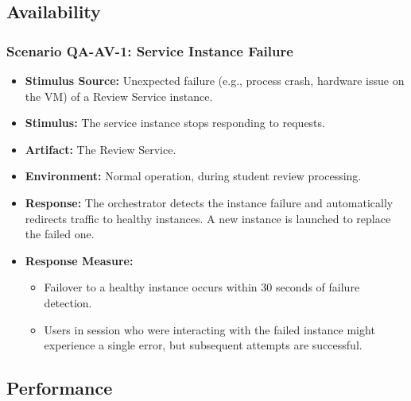 \subsection{Availability}

\subsubsection{Scenario QA-AV-1: Service Instance Failure}
\begin{itemize}
    \item \textbf{Stimulus Source:} Unexpected failure (e.g., process crash, hardware issue on the VM) of a Review Service instance.
    \item \textbf{Stimulus:} The service instance stops responding to requests.
    \item \textbf{Artifact:} The Review Service.
    \item \textbf{Environment:} Normal operation, during student review processing.
    \item \textbf{Response:} The orchestrator detects the instance failure and automatically redirects traffic to healthy instances. A new instance is launched to replace the failed one.
    \item \textbf{Response Measure:}
    \begin{itemize}
        \item Failover to a healthy instance occurs within 30 seconds of failure detection.
        \item Users in session who were interacting with the failed instance might experience a single error, but subsequent attempts are successful.
    \end{itemize}
\end{itemize}

\subsection{Performance}

